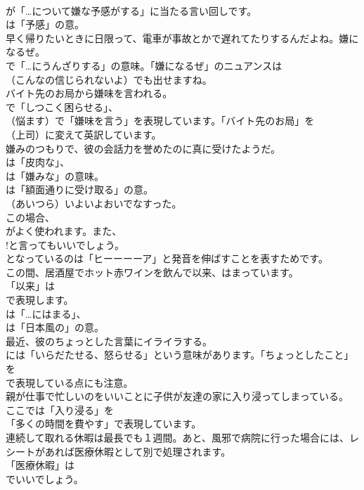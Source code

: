 \documentclass[8pt]{extreport}
\begin{document}
\begin{CJK}{UTF8}{min}
\\	が「…について嫌な予感がする」に当たる言い回しです。
\\	は「予感」の意。	
\\	早く帰りたいときに日限って、電車が事故とかで遅れてたりするんだよね。嫌になるぜ。 
\\	で「…にうんざりする」の意味。「嫌になるぜ」のニュアンスは
\\	（こんなの信じられないよ）でも出せますね。	
\\	バイト先のお局から嫌味を言われる。 
\\	で「しつこく困らせる」、
\\	（悩ます）で「嫌味を言う」を表現しています。「バイト先のお局」を 
\\	（上司）に変えて英訳しています。	
\\	嫌みのつもりで、彼の会話力を誉めたのに真に受けたようだ。 
\\	は「皮肉な」、
\\	は「嫌みな」の意味。
\\	は「額面通りに受け取る」の意。	
\\	（あいつら）いよいよおいでなすった。 
\\	この場合、
\\	がよく使われます。また、
\\	!と言ってもいいでしょう。
\\	となっているのは「ヒーーーーア」と発音を伸ばすことを表すためです。	
\\	この間、居酒屋でホット赤ワインを飲んで以来、はまっています。 
\\	「以来」は
\\	で表現します。
\\	は「…にはまる」、
\\	は「日本風の」の意。	
\\	最近、彼のちょっとした言葉にイライラする。 
\\	には「いらだたせる、怒らせる」という意味があります。「ちょっとしたこと」を
\\	で表現している点にも注意。	
\\	親が仕事で忙しいのをいいことに子供が友達の家に入り浸ってしまっている。 
\\	ここでは「入り浸る」を
\\	「多くの時間を費やす」で表現しています。	
\\	連続して取れる休暇は最長でも１週間。あと、風邪で病院に行った場合には、レシートがあれば医療休暇として別で処理されます。 
\\	「医療休暇」は 
\\	でいいでしょう。

\end{CJK}
\end{document}
